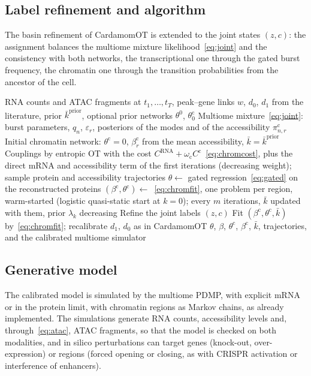 \documentclass[a4paper, 11pt]{article}
\newcommand{\thc}{\theta^{\mathrm{c}}}
\newcommand{\bc}{\beta^{\mathrm{c}}}
\theoremstyle{plain}
\theoremstyle{remark}
\begin{document}
\subsection{Label refinement and algorithm}

The basin refinement of CardamomOT is extended to the joint states $(z, c)$: the assignment balances the multiome mixture likelihood~\eqref{eq:joint} and the consistency with both networks, the transcriptional one through the gated burst frequency, the chromatin one through the transition probabilities from the ancestor of the cell.

\begin{algorithm}[H]
\caption{CardamomOT-multiome (sketch)}\label{alg:multiome}
\begin{algorithmic}[1]
\Require RNA counts and ATAC fragments at $t_1, \dots, t_T$, peak--gene links $w$, $d_0$, $d_1$ from the literature, prior $\bar k^{\mathrm{prior}}$, optional prior networks $\theta^0$, $\thc_0$
\State Multiome mixture~\eqref{eq:joint}: burst parameters, $q_n$, $\varepsilon_r$, posteriors of the modes and of the accessibility $\pi^{\mathrm{c}}_{n,r}$
\State Initial chromatin network: $\thc = 0$, $\bc_r$ from the mean accessibility, $\bar k = \bar k^{\mathrm{prior}}$
  \State Couplings by entropic OT with the cost $C^{\mathrm{RNA}} + \omega_{\mathrm c}C^{\mathrm{c}}$~\eqref{eq:chromcost}, plus the direct mRNA and accessibility term of the first iterations (decreasing weight); sample protein and accessibility trajectories
  \State $\theta \gets$ gated regression~\eqref{eq:gated} on the reconstructed proteins
  \State $(\bc, \thc) \gets$~\eqref{eq:chromfit}, one problem per region, warm-started (logistic quasi-static start at $k = 0$); every $m$ iterations, $\bar k$ updated with them, prior $\lambda_k$ decreasing
  \State Refine the joint labels $(z, c)$
\EndFor
\State Fit $(\bc, \thc, \bar k)$ by~\eqref{eq:chromfit}; recalibrate $d_1$, $d_0$ as in CardamomOT
\State \Return $\theta$, $\beta$, $\thc$, $\bc$, $\bar k$, trajectories, and the calibrated multiome simulator
\end{algorithmic}
\end{algorithm}

\subsection{Generative model}

The calibrated model is simulated by the multiome PDMP, with explicit mRNA or in the protein limit, with chromatin regions as Markov chains, as already implemented. The simulations generate RNA counts, accessibility levels and, through~\eqref{eq:atac}, ATAC fragments, so that the model is checked on both modalities, and in silico perturbations can target genes (knock-out, over-expression) or regions (forced opening or closing, as with CRISPR activation or interference of enhancers).
\end{document}
